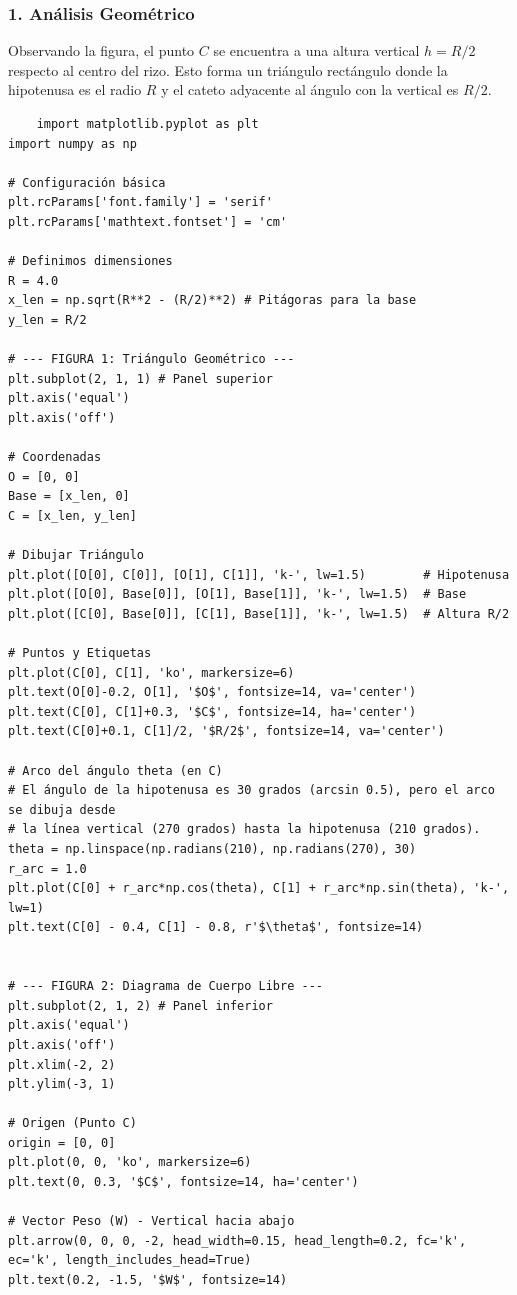 \documentclass[12pt, a4paper]{article}
\begin{document}
\subsubsection*{1. Análisis Geométrico}
Observando la figura, el punto $C$ se encuentra a una altura vertical $h = R/2$ respecto al centro del rizo. Esto forma un triángulo rectángulo donde la hipotenusa es el radio $R$ y el cateto adyacente al ángulo con la vertical es $R/2$.
\begin{lstlisting}
    import matplotlib.pyplot as plt
import numpy as np

# Configuración básica
plt.rcParams['font.family'] = 'serif'
plt.rcParams['mathtext.fontset'] = 'cm'

# Definimos dimensiones
R = 4.0
x_len = np.sqrt(R**2 - (R/2)**2) # Pitágoras para la base
y_len = R/2

# --- FIGURA 1: Triángulo Geométrico ---
plt.subplot(2, 1, 1) # Panel superior
plt.axis('equal')
plt.axis('off')

# Coordenadas
O = [0, 0]
Base = [x_len, 0]
C = [x_len, y_len]

# Dibujar Triángulo
plt.plot([O[0], C[0]], [O[1], C[1]], 'k-', lw=1.5)        # Hipotenusa
plt.plot([O[0], Base[0]], [O[1], Base[1]], 'k-', lw=1.5)  # Base
plt.plot([C[0], Base[0]], [C[1], Base[1]], 'k-', lw=1.5)  # Altura R/2

# Puntos y Etiquetas
plt.plot(C[0], C[1], 'ko', markersize=6)
plt.text(O[0]-0.2, O[1], '$O$', fontsize=14, va='center')
plt.text(C[0], C[1]+0.3, '$C$', fontsize=14, ha='center')
plt.text(C[0]+0.1, C[1]/2, '$R/2$', fontsize=14, va='center')

# Arco del ángulo theta (en C)
# El ángulo de la hipotenusa es 30 grados (arcsin 0.5), pero el arco se dibuja desde 
# la línea vertical (270 grados) hasta la hipotenusa (210 grados).
theta = np.linspace(np.radians(210), np.radians(270), 30)
r_arc = 1.0
plt.plot(C[0] + r_arc*np.cos(theta), C[1] + r_arc*np.sin(theta), 'k-', lw=1)
plt.text(C[0] - 0.4, C[1] - 0.8, r'$\theta$', fontsize=14)


# --- FIGURA 2: Diagrama de Cuerpo Libre ---
plt.subplot(2, 1, 2) # Panel inferior
plt.axis('equal')
plt.axis('off')
plt.xlim(-2, 2)
plt.ylim(-3, 1)

# Origen (Punto C)
origin = [0, 0]
plt.plot(0, 0, 'ko', markersize=6)
plt.text(0, 0.3, '$C$', fontsize=14, ha='center')

# Vector Peso (W) - Vertical hacia abajo
plt.arrow(0, 0, 0, -2, head_width=0.15, head_length=0.2, fc='k', ec='k', length_includes_head=True)
plt.text(0.2, -1.5, '$W$', fontsize=14)


\end{lstlisting}
\end{document}
